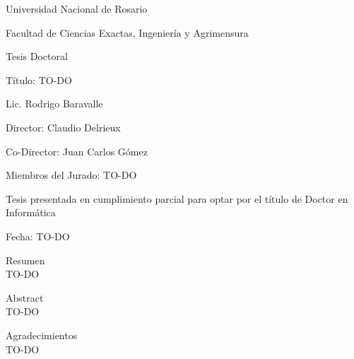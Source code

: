 \documentclass[spanish,a4paper,openright,11pt]{book}
\begin{document}
\begin{center}
\begin{titlepage}

Universidad Nacional de Rosario

Facultad de Ciencias Exactas, Ingeniería y Agrimensura

Tesis Doctoral

\vspace{2cm}


{\huge Título: TO-DO}
\vspace{2cm}

{\large Lic. Rodrigo Baravalle}
\vspace{2cm}

{\large Director: Claudio Delrieux}

{\large Co-Director: Juan Carlos Gómez}

\vspace{2cm}
{\large Miembros del Jurado: TO-DO}

\vspace{2cm}
{\large Tesis presentada en cumplimiento parcial para optar por el título de Doctor en Informática}

\vspace{1cm}
Fecha: TO-DO
\end{titlepage}
\end{center}




\begin{center}
{\huge Resumen}\\ TO-DO
\end{center}

\newpage
\begin{center}
{\huge Abstract}\\ TO-DO
\end{center}


\newpage
\begin{center}
{\huge Agradecimientos}\\ TO-DO
\end{center}

\newpage
\mbox{}
\thispagestyle{empty}

\tableofcontents
\cleardoublepage
{} %
\listoffigures %

\cleardoublepage
{} %
\listoftables %
\end{document}
